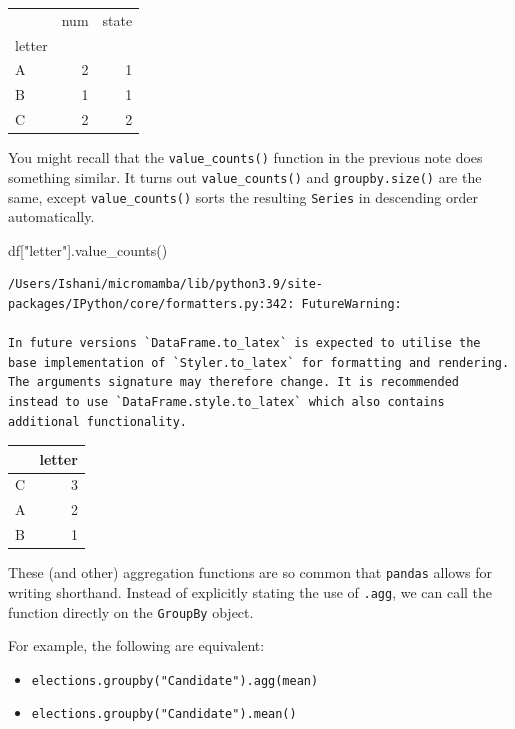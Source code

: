 \documentclass[
  letterpaper,
  DIV=11,
  numbers=noendperiod]{scrreprt}
\newenvironment{Shaded}{\begin{snugshade}}{\end{snugshade}}
\newcommand{\NormalTok}[1]{\textcolor[rgb]{0.00,0.23,0.31}{#1}}
\newcommand{\StringTok}[1]{\textcolor[rgb]{0.13,0.47,0.30}{#1}}
\providecommand{\tightlist}{%
  \setlength{\itemsep}{0pt}\setlength{\parskip}{0pt}}\usepackage{longtable,booktabs,array}
\begin{document}
\begin{tabular}{lrr}
\toprule
{} &  num &  state \\
letter &      &        \\
\midrule
A      &    2 &      1 \\
B      &    1 &      1 \\
C      &    2 &      2 \\
\bottomrule
\end{tabular}

You might recall that the \texttt{value\_counts()} function in the
previous note does something similar. It turns out
\texttt{value\_counts()} and \texttt{groupby.size()} are the same,
except \texttt{value\_counts()} sorts the resulting \texttt{Series} in
descending order automatically.

\begin{Shaded}
\begin{Highlighting}[]
\NormalTok{df[}\StringTok{"letter"}\NormalTok{].value\_counts()}
\end{Highlighting}
\end{Shaded}

\begin{verbatim}
/Users/Ishani/micromamba/lib/python3.9/site-packages/IPython/core/formatters.py:342: FutureWarning:

In future versions `DataFrame.to_latex` is expected to utilise the base implementation of `Styler.to_latex` for formatting and rendering. The arguments signature may therefore change. It is recommended instead to use `DataFrame.style.to_latex` which also contains additional functionality.
\end{verbatim}

\begin{tabular}{lr}
\toprule
{} &  letter \\
\midrule
C &       3 \\
A &       2 \\
B &       1 \\
\bottomrule
\end{tabular}

These (and other) aggregation functions are so common that
\texttt{pandas} allows for writing shorthand. Instead of explicitly
stating the use of \texttt{.agg}, we can call the function directly on
the \texttt{GroupBy} object.

For example, the following are equivalent:

\begin{itemize}
\tightlist
\item
  \texttt{elections.groupby("Candidate").agg(mean)}
\item
  \texttt{elections.groupby("Candidate").mean()}
\end{itemize}
\end{document}

